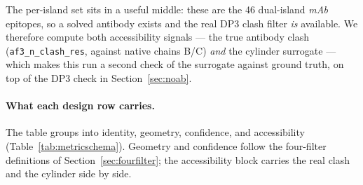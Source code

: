 The per-island set sits in a useful middle: these are the 46 dual-island \emph{mAb} epitopes,
so a solved antibody exists and the real DP3 clash filter \emph{is} available. We therefore
compute both accessibility signals --- the true antibody clash
(\texttt{af3\_n\_clash\_res}, against native chains B/C) \emph{and} the cylinder surrogate ---
which makes this run a second check of the surrogate against ground truth, on top of the DP3
check in Section~\ref{sec:noab}.

\paragraph{What each design row carries.}
The table groups into identity, geometry, confidence, and accessibility
(Table~\ref{tab:metricschema}). Geometry and confidence follow the four-filter definitions of
Section~\ref{sec:fourfilter}; the accessibility block carries the real clash and the cylinder
side by side.


